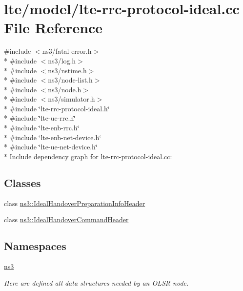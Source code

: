 \hypertarget{lte-rrc-protocol-ideal_8cc}{}\section{lte/model/lte-\/rrc-\/protocol-\/ideal.cc File Reference}
\label{lte-rrc-protocol-ideal_8cc}
{\ttfamily \#include $<$ns3/fatal-\/error.\+h$>$}\\*
{\ttfamily \#include $<$ns3/log.\+h$>$}\\*
{\ttfamily \#include $<$ns3/nstime.\+h$>$}\\*
{\ttfamily \#include $<$ns3/node-\/list.\+h$>$}\\*
{\ttfamily \#include $<$ns3/node.\+h$>$}\\*
{\ttfamily \#include $<$ns3/simulator.\+h$>$}\\*
{\ttfamily \#include \char`\"{}lte-\/rrc-\/protocol-\/ideal.\+h\char`\"{}}\\*
{\ttfamily \#include \char`\"{}lte-\/ue-\/rrc.\+h\char`\"{}}\\*
{\ttfamily \#include \char`\"{}lte-\/enb-\/rrc.\+h\char`\"{}}\\*
{\ttfamily \#include \char`\"{}lte-\/enb-\/net-\/device.\+h\char`\"{}}\\*
{\ttfamily \#include \char`\"{}lte-\/ue-\/net-\/device.\+h\char`\"{}}\\*
Include dependency graph for lte-\/rrc-\/protocol-\/ideal.cc\+:
\subsection*{Classes}
\begin{DoxyCompactItemize}
\item 
class \hyperlink{classns3_1_1IdealHandoverPreparationInfoHeader}{ns3\+::\+Ideal\+Handover\+Preparation\+Info\+Header}
\item 
class \hyperlink{classns3_1_1IdealHandoverCommandHeader}{ns3\+::\+Ideal\+Handover\+Command\+Header}
\end{DoxyCompactItemize}
\subsection*{Namespaces}
\begin{DoxyCompactItemize}
\item 
 \hyperlink{namespacens3}{ns3}
\begin{DoxyCompactList}\small\item\em Here are defined all data structures needed by an O\+L\+SR node. \end{DoxyCompactList}\end{DoxyCompactItemize}
